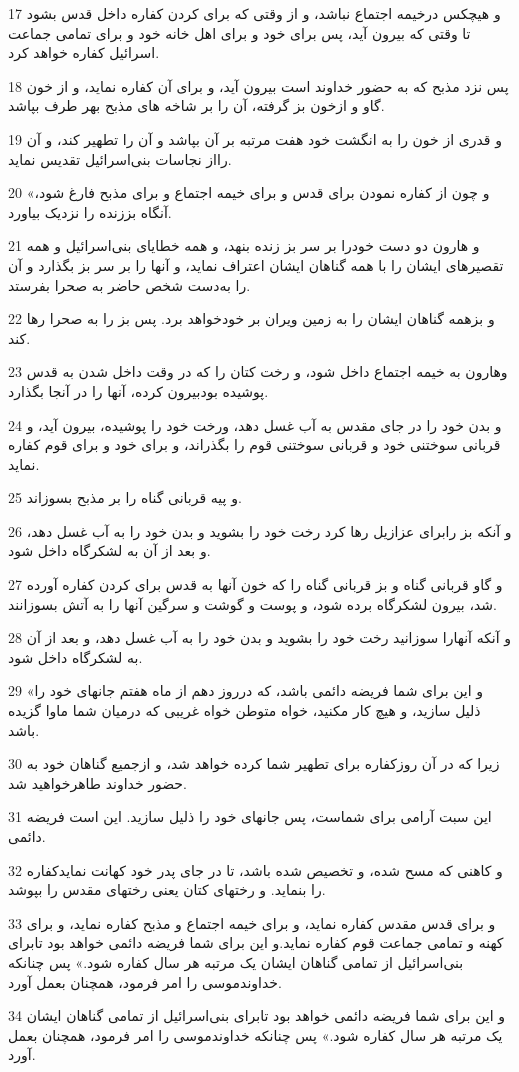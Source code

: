 \par 17 و هیچکس درخیمه اجتماع نباشد، و از وقتی که برای کردن کفاره داخل قدس بشود تا وقتی که بیرون آید، پس برای خود و برای اهل خانه خود و برای تمامی جماعت اسرائیل کفاره خواهد کرد.
\par 18 پس نزد مذبح که به حضور خداوند است بیرون آید، و برای آن کفاره نماید، و از خون گاو و ازخون بز گرفته، آن را بر شاخه های مذبح بهر طرف بپاشد.
\par 19 و قدری از خون را به انگشت خود هفت مرتبه بر آن بپاشد و آن را تطهیر کند، و آن رااز نجاسات بنی‌اسرائیل تقدیس نماید.
\par 20 «و چون از کفاره نمودن برای قدس و برای خیمه اجتماع و برای مذبح فارغ شود، آنگاه بززنده را نزدیک بیاورد.
\par 21 و هارون دو دست خودرا بر سر بز زنده بنهد، و همه خطایای بنی‌اسرائیل و همه تقصیرهای ایشان را با همه گناهان ایشان اعتراف نماید، و آنها را بر سر بز بگذارد و آن را به‌دست شخص حاضر به صحرا بفرستد.
\par 22 و بزهمه گناهان ایشان را به زمین ویران بر خودخواهد برد. پس بز را به صحرا رها کند.
\par 23 وهارون به خیمه اجتماع داخل شود، و رخت کتان را که در وقت داخل شدن به قدس پوشیده بودبیرون کرده، آنها را در آنجا بگذارد.
\par 24 و بدن خود را در جای مقدس به آب غسل دهد، ورخت خود را پوشیده، بیرون آید، و قربانی سوختنی خود و قربانی سوختنی قوم را بگذراند، و برای خود و برای قوم کفاره نماید.
\par 25 و پیه قربانی گناه را بر مذبح بسوزاند.
\par 26 و آنکه بز رابرای عزازیل رها کرد رخت خود را بشوید و بدن خود را به آب غسل دهد، و بعد از آن به لشکرگاه داخل شود.
\par 27 و گاو قربانی گناه و بز قربانی گناه را که خون آنها به قدس برای کردن کفاره آورده شد، بیرون لشکرگاه برده شود، و پوست و گوشت و سرگین آنها را به آتش بسوزانند.
\par 28 و آنکه آنهارا سوزانید رخت خود را بشوید و بدن خود را به آب غسل دهد، و بعد از آن به لشکرگاه داخل شود.
\par 29 «و این برای شما فریضه دائمی باشد، که درروز دهم از ماه هفتم جانهای خود را ذلیل سازید، و هیچ کار مکنید، خواه متوطن خواه غریبی که درمیان شما ماوا گزیده باشد.
\par 30 زیرا که در آن روزکفاره برای تطهیر شما کرده خواهد شد، و ازجمیع گناهان خود به حضور خداوند طاهرخواهید شد.
\par 31 این سبت آرامی برای شماست، پس جانهای خود را ذلیل سازید. این است فریضه دائمی.
\par 32 و کاهنی که مسح شده، و تخصیص شده باشد، تا در جای پدر خود کهانت نمایدکفاره را بنماید. و رختهای کتان یعنی رختهای مقدس را بپوشد.
\par 33 و برای قدس مقدس کفاره نماید، و برای خیمه اجتماع و مذبح کفاره نماید، و برای کهنه و تمامی جماعت قوم کفاره نماید.و این برای شما فریضه دائمی خواهد بود تابرای بنی‌اسرائیل از تمامی گناهان ایشان یک مرتبه هر سال کفاره شود.» پس چنانکه خداوندموسی را امر فرمود، همچنان بعمل آورد.
\par 34 و این برای شما فریضه دائمی خواهد بود تابرای بنی‌اسرائیل از تمامی گناهان ایشان یک مرتبه هر سال کفاره شود.» پس چنانکه خداوندموسی را امر فرمود، همچنان بعمل آورد.
 
